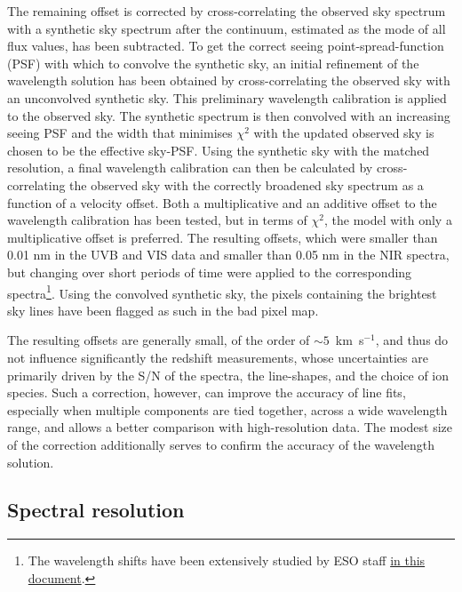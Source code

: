 \documentclass[longauth]{aa}    %
\begin{document}
The remaining offset is corrected by cross-correlating the observed sky spectrum
with a synthetic sky spectrum \citep{Noll2012, Jones2013} after the continuum,
estimated as the mode of all flux values, has been subtracted. To get the
correct seeing point-spread-function (PSF) with which to convolve the synthetic
sky, an initial refinement of the wavelength solution has been obtained by
cross-correlating the observed sky with an unconvolved synthetic sky. This
preliminary wavelength calibration is applied to the observed sky. The synthetic
spectrum is then convolved with an increasing seeing PSF and the width that
minimises $\chi^2$ with the updated observed sky is chosen to be the effective
sky-PSF. Using the synthetic sky with the matched resolution, a final wavelength
calibration can then be calculated by cross-correlating the observed sky with
the correctly broadened sky spectrum as a function of a velocity offset. Both a
multiplicative and an additive offset to the wavelength calibration has been
tested, but in terms of $\chi^2$, the model with only a multiplicative offset is
preferred. The resulting offsets, which were smaller than 0.01 nm in the UVB and
VIS data and smaller than 0.05 nm in the NIR spectra, but changing over short
periods of time were applied to the corresponding spectra\footnote{The
	wavelength shifts have been extensively studied by ESO staff
	\href{https://www.eso.org/sci/facilities/paranal/instruments/xshooter/doc/XS_wlc_shift_150615.pdf}{in
		this document}.}. Using the convolved synthetic sky, the pixels containing the
brightest sky lines have been flagged as such in the bad pixel map.

The resulting offsets are generally small, of the order of $\sim 5$~km~s$^{-1}$,
and thus do not influence significantly the redshift measurements, whose
uncertainties are primarily driven by the S/N of the spectra, the line-shapes,
and the choice of ion species. Such a correction, however, can improve the
accuracy of line fits, especially when multiple components are tied together,
across a wide wavelength range, and allows a better comparison with
high-resolution data. The modest size of the correction additionally serves to
confirm the accuracy of the wavelength solution. 


\subsection{Spectral resolution} \label{resolution}
\end{document}
